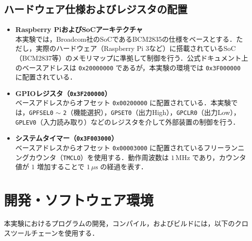 \documentclass{jlreq}
\begin{document}
  \subsection{ハードウェア仕様およびレジスタの配置}
  \begin{itemize}
      \item \textbf{Raspberry PiおよびSoCアーキテクチャ} \\
      本実験では，Broadcom社のSoCであるBCM2835の仕様をベースとする．ただし，実際のハードウェア（Raspberry Pi 3など）に搭載されているSoC（BCM2837等）のメモリマップに準拠して制御を行う．公式ドキュメント上のベースアドレスは \texttt{0x20000000} であるが，本実験の環境では \texttt{0x3F000000} に配置されている．
      
      \item \textbf{GPIOレジスタ（\texttt{0x3F200000}）} \\
      ベースアドレスからオフセット \texttt{0x00200000} に配置されている．本実験では，\texttt{GPFSEL0} $\sim$ \texttt{2}（機能選択），\texttt{GPSET0}（出力High），\texttt{GPCLR0}（出力Low），\texttt{GPLEV0}（入力読み取り）などのレジスタを介して外部装置の制御を行う．
      
      \item \textbf{システムタイマー（\texttt{0x3F003000}）} \\
      ベースアドレスからオフセット \texttt{0x00003000} に配置されているフリーランニングカウンタ（\texttt{TMCLO}）を使用する．動作周波数は $1\,\text{MHz}$ であり，カウンタ値が $1$ 増加することで $1\,\mu\text{s}$ の経過を表す．
  \end{itemize}

  \section{開発・ソフトウェア環境}
  本実験におけるプログラムの開発，コンパイル，およびビルドには，以下のクロスツールチェーンを使用する．
\end{document}
